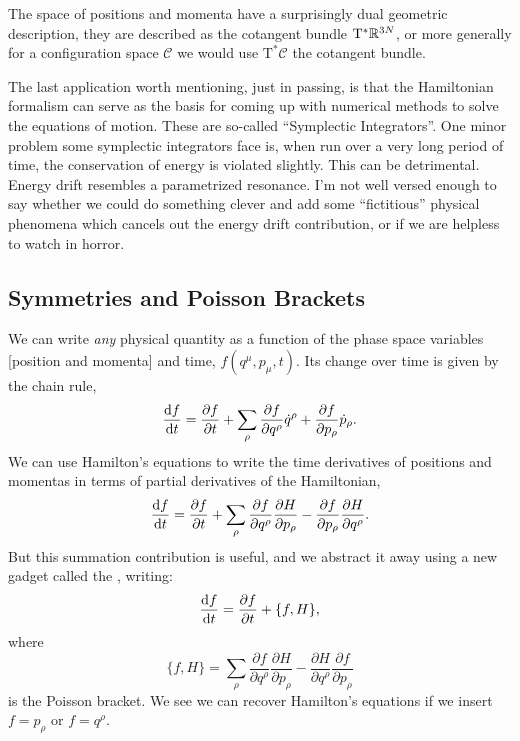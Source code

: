 The space of positions and momenta have a surprisingly dual geometric
description, they are described as the cotangent bundle
$\mathrm{T}^{*}\mathbb{R}^{3N}$, or more generally for a configuration space
$\mathcal{C}$ we would use $\mathrm{T}^{*}\mathcal{C}$ the cotangent bundle.

The last application worth mentioning, just in passing, is that the
Hamiltonian formalism can serve as the basis for coming up with
numerical methods to solve the equations of motion. These are so-called
``Symplectic Integrators''. One minor problem some symplectic
integrators face is, when run over a very long period of time, the
conservation of energy is violated slightly. This can be
detrimental. Energy drift resembles a parametrized resonance. I'm not
well versed enough to say whether we could do something clever and add
some ``fictitious'' physical phenomena which cancels out the energy
drift contribution, or if we are helpless to watch in horror.

\subsection{Symmetries and Poisson Brackets}

We can write \emph{any} physical quantity as a function of the phase
space variables [position and momenta] and time, $f(q^{\mu}, p_{\mu}, t)$.
Its change over time is given by the chain rule,
\begin{equation}
\frac{\mathrm{d} f}{\mathrm{d} t} = \frac{\partial f}{\partial t} +
\sum_{\rho}\frac{\partial f}{\partial q^{\rho}}\dot{q}^{\rho} +  
\frac{\partial f}{\partial p_{\rho}}\dot{p}_{\rho}.
\end{equation}
We can use Hamilton's equations to write the time derivatives of
positions and momentas in terms of partial derivatives of the Hamiltonian,
\begin{equation}
\frac{\mathrm{d} f}{\mathrm{d} t} = \frac{\partial f}{\partial t} +
\sum_{\rho}\frac{\partial f}{\partial q^{\rho}}\frac{\partial H}{\partial p_{\rho}} -
\frac{\partial f}{\partial p_{\rho}}\frac{\partial H}{\partial q^{\rho}}.
\end{equation}
But this summation contribution is useful, and we abstract it away using
a new gadget called the , writing:
\begin{equation}
\frac{\mathrm{d} f}{\mathrm{d} t} = \frac{\partial f}{\partial t} + \{f, H\},
\end{equation}
where
\begin{equation}
\{f, H\} = \sum_{\rho}\frac{\partial f}{\partial q^{\rho}}\frac{\partial H}{\partial p_{\rho}}
- \frac{\partial H}{\partial q^{\rho}}\frac{\partial f}{\partial p_{\rho}}
\end{equation}
is the Poisson bracket. We see we can recover Hamilton's equations if we
insert $f=p_{\rho}$ or $f=q^{\rho}$.

